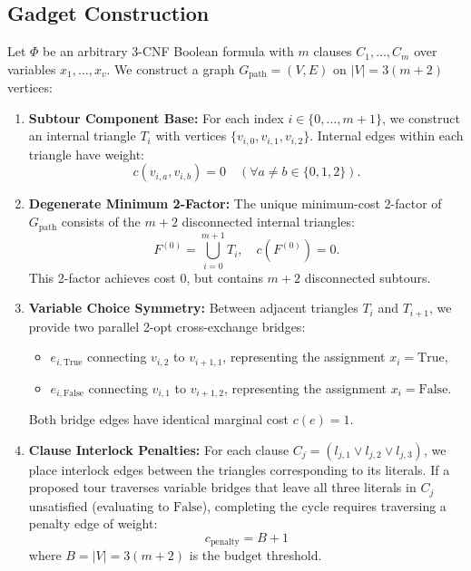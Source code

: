\documentclass[11pt,a4paper]{article}
\renewcommand{\_}{\origunderscore\allowbreak}
\theoremstyle{plain}
\theoremstyle{definition}
\theoremstyle{remark}
\begin{document}
\subsection{Gadget Construction}
Let $\Phi$ be an arbitrary 3-CNF Boolean formula with $m$ clauses $C_1, \dots, C_m$ over variables $x_1, \dots, x_v$. We construct a graph $G_{\text{path}} = (V, E)$ on $|V| = 3(m + 2)$ vertices:
\begin{enumerate}
  \item \textbf{Subtour Component Base:} For each index $i \in \{0, \dots, m+1\}$, we construct an internal triangle $T_i$ with vertices $\{v_{i, 0}, v_{i, 1}, v_{i, 2}\}$. Internal edges within each triangle have weight:
  \begin{equation}
    c(v_{i, a}, v_{i, b}) = 0 \quad (\forall a \ne b \in \{0, 1, 2\}).
  \end{equation}
  \item \textbf{Degenerate Minimum 2-Factor:} The unique minimum-cost 2-factor of $G_{\text{path}}$ consists of the $m + 2$ disconnected internal triangles:
  \begin{equation}
    F^{(0)} = \bigcup_{i=0}^{m+1} T_i, \quad c(F^{(0)}) = 0.
  \end{equation}
  This 2-factor achieves cost $0$, but contains $m + 2$ disconnected subtours.
  \item \textbf{Variable Choice Symmetry:} Between adjacent triangles $T_i$ and $T_{i+1}$, we provide two parallel 2-opt cross-exchange bridges:
  \begin{itemize}
    \item $e_{i, \text{True}}$ connecting $v_{i, 2}$ to $v_{i+1, 1}$, representing the assignment $x_i = \text{True}$,
    \item $e_{i, \text{False}}$ connecting $v_{i, 1}$ to $v_{i+1, 2}$, representing the assignment $x_i = \text{False}$.
  \end{itemize}
  Both bridge edges have identical marginal cost $c(e) = 1$.
  \item \textbf{Clause Interlock Penalties:} For each clause $C_j = (l_{j, 1} \lor l_{j, 2} \lor l_{j, 3})$, we place interlock edges between the triangles corresponding to its literals. If a proposed tour traverses variable bridges that leave all three literals in $C_j$ unsatisfied (evaluating to $\text{False}$), completing the cycle requires traversing a penalty edge of weight:
  \begin{equation}
    c_{\text{penalty}} = B + 1
  \end{equation}
  where $B = |V| = 3(m + 2)$ is the budget threshold.
\end{enumerate}
\end{document}
